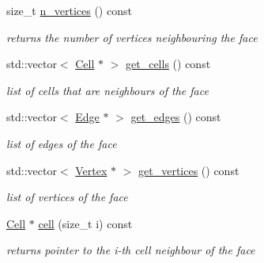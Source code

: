 \begin{DoxyCompactItemize}
size\+\_\+t \hyperlink{group__Mesh_ga50edc49af3d9f7433e238e9d18f7f11c}{n\+\_\+vertices} () const
\begin{DoxyCompactList}\small\item\em returns the number of vertices neighbouring the face \end{DoxyCompactList}\item 
\mbox{\label{classHArDCore3D_1_1Face_aa209c78a79161da020d96bdd752d8e87}} 
std\+::vector$<$ \hyperlink{classHArDCore3D_1_1Cell}{Cell} $\ast$ $>$ \hyperlink{classHArDCore3D_1_1Face_aa209c78a79161da020d96bdd752d8e87}{get\+\_\+cells} () const
\begin{DoxyCompactList}\small\item\em list of cells that are neighbours of the face \end{DoxyCompactList}\item 
\mbox{\label{classHArDCore3D_1_1Face_abb3add94aa880748646382717345c1ec}} 
std\+::vector$<$ \hyperlink{classHArDCore3D_1_1Edge}{Edge} $\ast$ $>$ \hyperlink{classHArDCore3D_1_1Face_abb3add94aa880748646382717345c1ec}{get\+\_\+edges} () const
\begin{DoxyCompactList}\small\item\em list of edges of the face \end{DoxyCompactList}\item 
\mbox{\label{classHArDCore3D_1_1Face_a4be6533a35079c67abfedc8dd65d01f1}} 
std\+::vector$<$ \hyperlink{classHArDCore3D_1_1Vertex}{Vertex} $\ast$ $>$ \hyperlink{classHArDCore3D_1_1Face_a4be6533a35079c67abfedc8dd65d01f1}{get\+\_\+vertices} () const
\begin{DoxyCompactList}\small\item\em list of vertices of the face \end{DoxyCompactList}\item 
\mbox{\label{classHArDCore3D_1_1Face_ab463b4972c43d6f62f034cf8c0ed70c2}} 
\hyperlink{classHArDCore3D_1_1Cell}{Cell} $\ast$ \hyperlink{classHArDCore3D_1_1Face_ab463b4972c43d6f62f034cf8c0ed70c2}{cell} (size\+\_\+t i) const
\begin{DoxyCompactList}\small\item\em returns pointer to the i-\/th cell neighbour of the face \end{DoxyCompactList}\item 

\end{DoxyCompactItemize}
